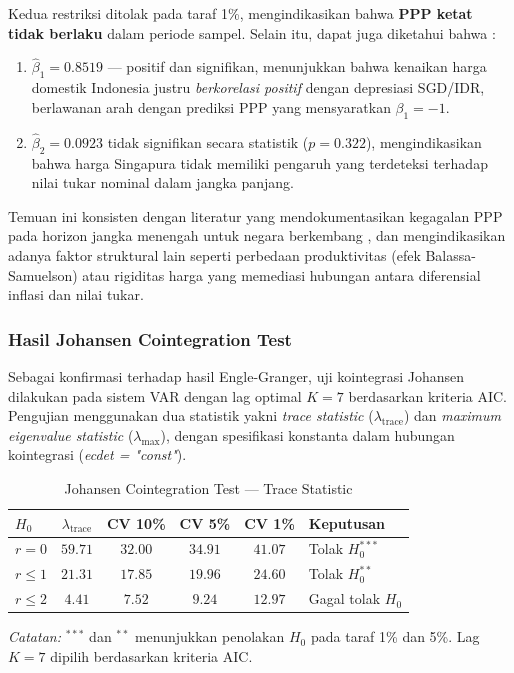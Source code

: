 \documentclass[12pt]{article}
\begin{document}
Kedua restriksi ditolak pada taraf 1\%, mengindikasikan bahwa \textbf{PPP ketat tidak 
berlaku} dalam periode sampel. Selain itu, dapat juga diketahui bahwa :
\begin{enumerate}
    \item $\hat{\beta}_1 = 0.8519$ — positif dan signifikan, menunjukkan bahwa kenaikan harga 
domestik Indonesia justru \textit{berkorelasi positif} dengan depresiasi SGD/IDR, 
berlawanan arah dengan prediksi PPP yang mensyaratkan $\beta_1 = -1$.
\item $\hat{\beta}_2 = 0.0923$ tidak signifikan secara statistik ($p = 0.322$), 
mengindikasikan bahwa harga Singapura tidak memiliki pengaruh yang terdeteksi terhadap 
nilai tukar nominal dalam jangka panjang. 
\end{enumerate}


Temuan ini konsisten dengan literatur yang 
mendokumentasikan kegagalan PPP pada horizon jangka menengah untuk negara berkembang 
\citep{Rogoff1996}, dan mengindikasikan adanya faktor struktural lain seperti 
perbedaan produktivitas (efek Balassa-Samuelson) atau rigiditas harga yang 
memediasi hubungan antara diferensial inflasi dan nilai tukar.

\subsubsection{Hasil Johansen Cointegration Test}

Sebagai konfirmasi terhadap hasil Engle-Granger, uji kointegrasi Johansen dilakukan 
pada sistem VAR dengan lag optimal $K = 7$ berdasarkan kriteria AIC. Pengujian 
menggunakan dua statistik yakni \textit{trace statistic} ($\lambda_{\text{trace}}$) dan 
\textit{maximum eigenvalue statistic} ($\lambda_{\text{max}}$), dengan spesifikasi 
konstanta dalam hubungan kointegrasi (\textit{ecdet = "const"}).

\begin{table}[H]
    \centering
    \caption{Johansen Cointegration Test --- Trace Statistic}
    \label{tab:johansen_trace}
    \begin{tabular}{lccccl}
        \toprule
        $H_0$ & $\lambda_{\text{trace}}$ & CV 10\% & CV 5\% & CV 1\% & Keputusan \\
        \midrule
        $r = 0$    & $59.71$ & $32.00$ & $34.91$ & $41.07$ & Tolak $H_0^{***}$ \\
        $r \leq 1$ & $21.31$ & $17.85$ & $19.96$ & $24.60$ & Tolak $H_0^{**}$ \\
        $r \leq 2$ & $4.41$  & $7.52$  & $9.24$  & $12.97$ & Gagal tolak $H_0$ \\
        \bottomrule
    \end{tabular}
    \begin{tablenotes}
        \small
        \item \textit{Catatan:} $^{***}$ dan $^{**}$ menunjukkan penolakan $H_0$ pada 
        taraf 1\% dan 5\%. Lag $K = 7$ dipilih berdasarkan kriteria AIC.
    \end{tablenotes}
\end{table}
\end{document}
